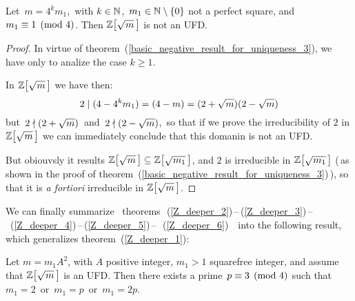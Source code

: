 \begin{thm}\label{Z_deeper_6}
Let\, $m = 4^k m_1$,\, with $k \in \mathbb{N}$,\, $m_1 \in \mathbb{N}\setminus\left\{0\right\}$
not a perfect square, and\, $m_1 \equiv 1 \pmod 4$.
Then $\ZZ{m}$ is not an UFD.
\end{thm}

\begin{proof}
%
In virtue of theorem~(\ref{basic_negative_result_for_uniqueness_3}),
we have only to analize the case $k \geq 1$.

In $\ZZ{m}$ we have then:
$$
  2 \mid (4 - 4^k m_1) = (4 - m) =
  (2+\sqrt{m})(2 - \sqrt{m})
$$
but\, $2 \nmid (2 + \sqrt{m})$\, and\,
$2 \nmid (2 - \sqrt{m})$,\, so that if we
prove the irreducibility of $2$ in $\ZZ{m}$
we can immediately conclude that this domanin is
not an UFD.

But obiouvsly it results $\ZZ{m} \subseteq \ZZ{m_1}$,
and $2$ is irreducible in $\ZZ{m_1}$
(\,as shown in the proof of
theorem~(\ref{basic_negative_result_for_uniqueness_3})\,),
so that it is \textit{a fortiori} irreducible in
$\ZZ{m}$.
%
\end{proof}

\medskip
We can finally summarize
\mbox{%
theorems\, (\ref{Z_deeper_2})\,--\,(\ref{Z_deeper_3})\,--\,%
(\ref{Z_deeper_4})\,--\,(\ref{Z_deeper_5})\,--\,%
(\ref{Z_deeper_6})\,%
} into the following result,
which generalizes theorem~(\ref{Z_deeper_1}):

\begin{thm}\label{Z_DEEPER}
Let $m = m_1 A^2$, with $A$ positive integer, $m_1 > 1$
squarefree integer, and assume that $\ZZ{m}$ is an
UFD.
Then there exists a prime\,
$p \equiv 3 \pmod 4$ such that\:
$m_1 = 2$\, or\, $m_1 = p$\, or\, $m_1 = 2p$.
\end{thm}

